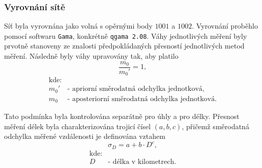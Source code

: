 \subsubsection{Vyrovnání sítě}

\tab Síť byla vyrovnána jako volná s opěrnými body $1001$ a $1002$. Vyrovnání proběhlo pomocí softwaru \texttt{Gama}, konkrétně \texttt{qgama 2.08}. Váhy jednotlivých měření byly prvotně stanoveny ze znalosti předpokládaných přesností jednotlivých metod měření. Následně byly váhy upravovány tak, aby platilo
\[
\frac{m_0}{m_0'} = 1 ,
\]
\[
\begin{array}{ll}
\text{kde:}& \\
m_0' & \text{- apriorní směrodatná odchylka jednotková}, \\[6pt]
m_0  & \text{- aposteriorní směrodatná odchylka jednotková}.
\end{array}
\]

\tab Tato podmínka byla kontrolována separátně pro úhly a pro délky. 
Přesnost měření délek byla charakterizována trojicí čísel $(a,b,c)$, 
přičemž směrodatná odchylka měřené vzdálenosti je definována vztahem
\[
\sigma_D = a + b \cdot D^c ,
\]
\[
\begin{array}{ll}
\text{kde:}& \\
D & \text{- délka v kilometrech}.
\end{array}
\]
